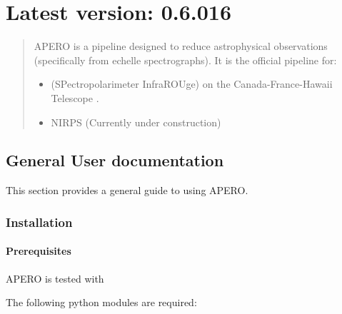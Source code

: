 \documentclass[a4paper,10pt,english]{report}
\begin{document}
\chapter{Latest version: 0.6.016}
\label{\detokenize{index:latest-version-0-6-016}}\begin{quote}

APERO is a pipeline designed to reduce astrophysical observations (specifically from echelle spectrographs).
It is the official pipeline for:
\begin{itemize}
\item {} 
 (SPectropolarimeter InfraROUge) on the Canada-France-Hawaii Telescope .

\item {} 
NIRPS (Currently under construction)

\end{itemize}
\end{quote}


\section{General User documentation}
\label{\detokenize{user/general_guide:general-user-documentation}}\label{\detokenize{user/general_guide:general-guide}}\label{\detokenize{user/general_guide::doc}}
This section provides a general guide to using APERO.


\subsection{Installation}
\label{\detokenize{user/general/installation:installation}}\label{\detokenize{user/general/installation:id1}}\label{\detokenize{user/general/installation::doc}}

\subsubsection{Prerequisites}
\label{\detokenize{user/general/installation:prerequisites}}\label{\detokenize{user/general/installation:installation-prerequisites}}
APERO is tested with 

The following python modules are required:

\begin{sphinxVerbatim}[commandchars=\\\{\}]
\end{sphinxVerbatim}
\end{document}
